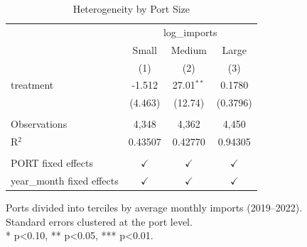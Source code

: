 \begin{table}[htbp]
   \caption{\label{tab:het_size} Heterogeneity by Port Size}
   \bigskip
   \centering
   \begin{tabular}{lccc}
      \toprule
       & \multicolumn{3}{c}{log\_imports}\\
                                 & Small         & Medium        & Large \\   
                                 & (1)           & (2)           & (3)\\  
      \midrule 
      treatment                  & -1.512        & 27.01$^{**}$  & 0.1780\\   
                                 & (4.463)       & (12.74)       & (0.3796)\\   
       \\
      Observations               & 4,348         & 4,362         & 4,450\\  
      R$^2$                      & 0.43507       & 0.42770       & 0.94305\\  
       \\
      PORT fixed effects         & $\checkmark$  & $\checkmark$  & $\checkmark$\\   
      year\_month fixed effects  & $\checkmark$  & $\checkmark$  & $\checkmark$\\   
      \bottomrule
   \end{tabular}
   
   \par \raggedright 
   Ports divided into terciles by average monthly imports (2019--2022).\\
   Standard errors clustered at the port level.\\
   * p<0.10, ** p<0.05, *** p<0.01.
\end{table}

